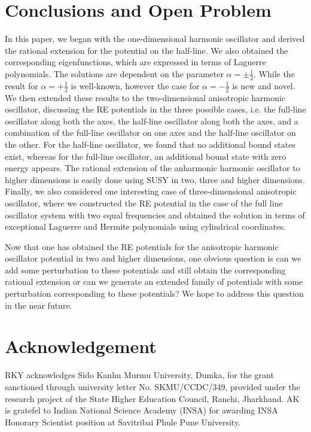 \documentclass[12pt]{article}
\numberwithin{equation}{section} %
\begin{document}
\section{Conclusions and Open Problem}
In this paper, we began with the one-dimensional harmonic oscillator and 
derived the rational extension for the potential on the half-line. We also 
obtained the corresponding eigenfunctions, which are expressed in terms of 
Laguerre polynomials. The solutions are dependent on the parameter 
\(\alpha=\pm\frac{1}{2}\). While the result for \(\alpha = +\frac{1}{2}\) is 
well-known, however the case for \(\alpha = -\frac{1}{2}\) is new and novel.
We then extended these results to the two-dimensional anisotropic harmonic 
oscillator, discussing the RE potentials in the three possible cases, i.e. the 
full-line oscillator along both the axes, the half-line oscillator along both 
the axes, and a combination of
the full-line oscillator on one axes and the half-line oscillator on the other.
For the half-line oscillator, we found that no additional bound states exist, 
whereas for the full-line oscillator, an additional bound state with zero 
energy appears. The rational extension of the anharmonic harmonic oscillator to
higher dimensions is easily done using SUSY in two, three and higher 
dimensions. Finally, we also considered one interesting case of 
three-dimensional anisotropic oscillator, where we constructed the RE potential
in the case of the full line oscillator system with two equal frequencies and 
obtained the solution in terms of exceptional Laguerre and Hermite polynomials 
using cylindrical coordinates. 

Now that one has obtained the RE potentials for the anisotropic harmonic 
oscillator potential in two and higher dimensions, one obvious question is
can we add some perturbation to these potentials and still obtain the 
corresponding rational extension or can we generate an extended family of potentials with some perturbation corresponding to these potentials? We hope to address this question in the 
near future. 

\section*{Acknowledgement}
RKY acknowledges Sido Kanhu Murmu University, Dumka, for the grant sanctioned through university letter No. SKMU/CCDC/349, provided under the research project of the State Higher Education Council, Ranchi, Jharkhand. AK is gratefel to Indian National Science Academy (INSA) for awarding INSA Honorary Scientist position at Savitribai Phule Pune University.
\end{document}

